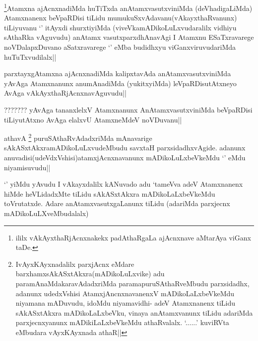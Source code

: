 
\begin{artha}
\footnote{ililx vAkAyxthaRjAcnxnakekx padAthaRgaLa ajAcnxnave aMtarAya viGanx taDe.}Atamxna ajAcnxnadiMda huTiTxda anAtamxvasutxviniMda (deVhadigaLiMda) Atamxnanenx beVpaRDisi tiLidu mumukuSxvAdavanu(vAkayxthaRvanunx) tiLiyuvanu `\stext' itAyxdi shurxtiyiMda (viveVkamADikoLuLxvudaralilx vidhiyu sAthaRka vAguvudu) anAtamx vasutxparxdhAnavAgi I Atamxnu ESaTxravarege noVDalapxDuvano aSatxravarege `\stext' eMba budidhxyu viGanxviruvudariMda huTuTxvudilalx||
\end{artha}


\begin{artha}
parxtayxgAtamxna ajAcnxnadiMda kalipxtavAda anAtamxvasutxviniMda yAvAga Atamxnanunx anumAnadiMda (yukitxyiMda) leVpaRDisutAtxneyo AvAga vAkAyxthaRjAcnxnavAguvudu||
\end{artha}


\begin{artha}
??????? yAvAga tananxlelxV Atamxnanunx AnAtamxvasutxviniMda beVpaRDisi tiLiyutAtxno AvAga elalxvU AtamxneMdeV noVDuvanu||
\end{artha}


\begin{artha}
athavA \footnote{IvAyxKAyxnadalilx parxjAcnx eMdare barxhamxsAkASxtAkxra(mADikoLuLxvike) adu paramAnaMdakaravAdadxriMda paramapuruSAthaRveMbudu parxsidadhx, adanunx udedxVshisi AtamxjAncnxnavanenxV mADikoLaLxbeVkeMdu niyamana mADuvudu, idoMdu niyamavidhi- adeV Atamxnanenx tiLidu sAkASxtAkxra mADikoLaLxbeVku, vinaya anAtamxvanunx tiLidu adariMda parxjecnxyanunx mADikiLaLxbeVkeMdu athaRvalalx. `\stext......' kuviRVta eMbudara vAyxKAyxnada athaR||} puruSAthaRvAdadxriMda mAnavarige sAkASxtAkxramADikoLuLxvudeMbudu savxtaH parxsidadhxvAgide. adanunx anuvadisi(udeVdxVshisi)atamxjAcnxnavanunx mADikoLuLxbeVkeMdu `\stext' eMdu niyamisuvudu||
\end{artha}


\begin{artha}
`\stext' yiMdu yAvudu I vAkayxdalilx kANuvado adu `tameVva adeV Atamxnanenx hiMde heVLidadxMte tiLidu sAkASxtAkxra mADikoLaLxbeVkeMdu toVrutatxde. Adare anAtamxvasutxgaLanunx tiLidu (adariMda parxjecnx mADikoLuLXveMbudalalx)
\end{artha}

